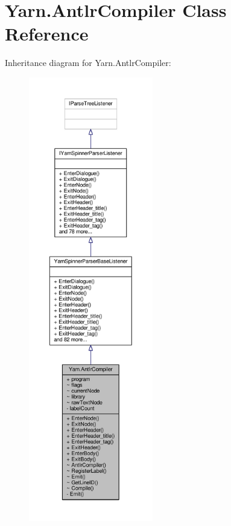 \hypertarget{a00038}{\section{Yarn.\-Antlr\-Compiler Class Reference}
\label{a00038}
}


Inheritance diagram for Yarn.\-Antlr\-Compiler\-:
\nopagebreak
\begin{figure}[H]
\begin{center}
\leavevmode
\includegraphics[height=550pt]{a00591}
\end{center}
\end{figure}


